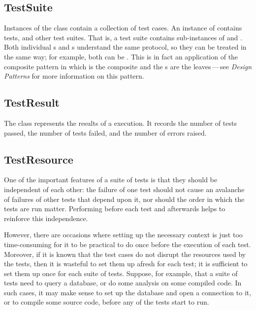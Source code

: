 \documentclass[a4paper,10pt,twoside]{book}
\begin{document}
\subsection{TestSuite}

Instances of the class  contain a collection of test cases.  An
instance of  contains tests, and other test suites.
That is, a test suite contains sub-instances of
 and .
Both individual s and s understand the same protocol, so they can be treated in the same way; for example, both can be .
This is in fact an application of the composite
pattern in which  is the composite and the
s are the leaves\,---\,see \textit{Design Patterns} for more information on this pattern\cite{Gamm95a}.
\subsection{TestResult}

The class  represents the results of a
 execution.  It records the number of tests passed,
the number of tests failed, and the number of errors raised.

\subsection{TestResource}
\label{sec:resource}

One of the important  features of a suite of tests is that they should be independent of each other: the failure of one test should not cause an avalanche of failures of other tests that depend upon it, nor should the order in which the tests are run matter.
Performing  before each test and  afterwards helps to reinforce this independence. 

However, there are occasions where setting up the necessary context is just too time-consuming for it to be practical to do once before the execution of each test.
Moreover, if it is known that the test cases do not disrupt the resources used by the tests, then it is wasteful to set them up afresh for each test; it is sufficient to set them up once for each suite of tests.
Suppose, for example, that a suite of tests need to query a database, or do some analysis on some compiled code.
In such cases, it may make sense to set up the database and open a connection to it, or to compile some source code, before any of the tests start to run.
\end{document}
